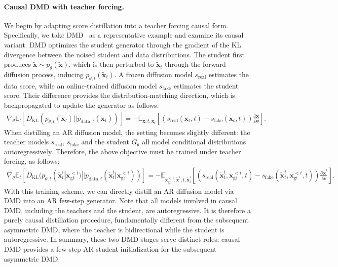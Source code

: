 \documentclass{llmxive}
\providecommand{\bm}[1]{\boldsymbol{#1}}
\providecommand{\E}{\mathbb{E}}
\providecommand{\KL}{D_{\mathrm{KL}}}
\providecommand{\vx}{{\bm{x}}}
\begin{document}
\paragraph{Causal DMD with teacher forcing.} We begin by adapting score distillation into a teacher forcing causal form. Specifically, we take DMD~\cite{wang2023prolificdreamer,luo2023diff,yin2024one,yin2024improved} as a representative example and examine its causal variant. DMD optimizes the student generator through the gradient of the KL divergence between the noised student and data distributions. The student first produces $\tilde{\vx}\sim p_\theta(\tilde{\vx})$, which is then perturbed to $\tilde{\vx}_t$ through the forward diffusion process, inducing $p_{\theta,t}(\tilde{\vx}_t)$. A frozen diffusion model $s_{\text{real}}$ estimates the data score, while an online-trained diffusion model $s_{\text{fake}}$ estimates the student score. Their difference provides the distribution-matching direction, which is backpropagated to update the generator as follows:
\begin{align}
\label{eq:dmd}
\nabla_\theta\E_t[\KL(p_{\theta,t}(\tilde{\vx}_t)||p_{\text{data},t}(\tilde{\vx}_t))]
   = -\E_{\tilde{\vx}, t, \tilde{\vx}_t}[(s_\text{real}(\tilde{\vx}_t,t)-s_\text{fake}(\tilde{\vx}_t,t))\frac{\partial \tilde{\vx}}{\partial \theta}].
\end{align}
When distilling an AR diffusion model, the setting becomes slightly different: the teacher models $s_\text{real}$, $s_\text{fake}$ and the student $G_\theta$ all model conditional distributions autoregressively. Therefore, the above objective must be trained under teacher forcing, as follows:
\begin{align}
\label{eq:causal-dmd}
\nabla_\theta\E_t[\KL(p_{\theta,t}(\tilde{\vx}_t^i|\vx_{\mathrm{gt}}^{<i})||p_{\text{data},t}(\tilde{\vx}_t^i|\vx_{\mathrm{gt}}^{<i}))]
   = -\E_{\vx_{\mathrm{gt}}^{<i},\tilde{\vx}^i, t, \tilde{\vx}_t^i}[(s_\text{real}(\tilde{\vx}_t^i,\vx_{\mathrm{gt}}^{<i},t)-s_\text{fake}(\tilde{\vx}_t^i,\vx_{\mathrm{gt}}^{<i},t))\frac{\partial \tilde{\vx}^i}{\partial \theta}].
\end{align}
With this training scheme, we can directly distill an AR diffusion model via DMD into an AR few-step generator. Note that all models involved in causal DMD, including the teachers and the student, are autoregressive. It is therefore a purely causal distillation procedure, fundamentally different from the subsequent asymmetric DMD, where the teacher is bidirectional while the student is autoregressive. In summary, these two DMD stages serve distinct roles: causal DMD provides a few-step AR student initialization for the subsequent asymmetric DMD.
\end{document}
